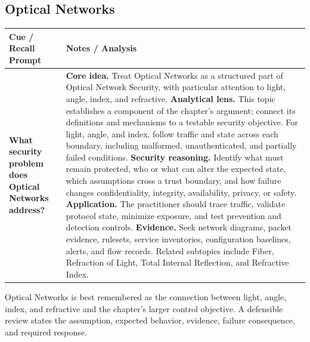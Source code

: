 \documentclass[11pt]{article}
\newcommand{\CornellHeader}{%
\rowcolor{Navy}\color{white}\bfseries Cue / Recall Prompt & \color{white}\bfseries Notes / Analysis\\\hline}
\newcommand{\CornellRow}[2]{%
\cellcolor{CueGray}\RaggedRight\textbf{#1} & \RaggedRight #2\\\hline}
\begin{document}
\subsection*{Optical Networks}
\begin{longtable}{>{\RaggedRight\arraybackslash}p{}|>{\RaggedRight\arraybackslash}p{}}
\CornellHeader
\CornellRow{What security problem does Optical Networks address?}{\textbf{Core idea.} Treat Optical Networks as a structured part of Optical Network Security, with particular attention to light, angle, index, and refractive. \textbf{Analytical lens.} This topic establishes a component of the chapter's argument; connect its definitions and mechanisms to a testable security objective. For light, angle, and index, follow traffic and state across each boundary, including malformed, unauthenticated, and partially failed conditions. \textbf{Security reasoning.} Identify what must remain protected, who or what can alter the expected state, which assumptions cross a trust boundary, and how failure changes confidentiality, integrity, availability, privacy, or safety. \textbf{Application.} The practitioner should trace traffic, validate protocol state, minimize exposure, and test prevention and detection controls. \textbf{Evidence.} Seek network diagrams, packet evidence, rulesets, service inventories, configuration baselines, alerts, and flow records. Related subtopics include Fiber, Refraction of Light, Total Internal Reflection, and Refractive Index.}
\end{longtable}
\begin{topicsummary}
Optical Networks is best remembered as the connection between light, angle, index, and refractive and the chapter's larger control objective. A defensible review states the assumption, expected behavior, evidence, failure consequence, and required response.
\end{topicsummary}
\end{document}
